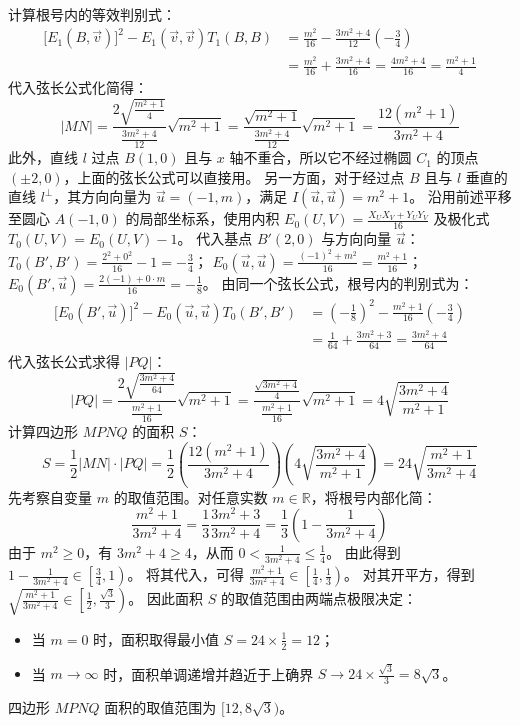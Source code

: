 \begin{solution}
计算根号内的等效判别式：
\begin{align*}
\big[E_1(B, \vec{v})\big]^2 - E_1(\vec{v}, \vec{v})T_1(B, B) &= \frac{m^2}{16} - \frac{3m^2 + 4}{12} \left(-\frac{3}{4}\right) \\
&= \frac{m^2}{16} + \frac{3m^2 + 4}{16} = \frac{4m^2 + 4}{16} = \frac{m^2 + 1}{4}
\end{align*}
代入弦长公式化简得：
$$ |MN| = \frac{2 \sqrt{\frac{m^2 + 1}{4}}}{\frac{3m^2 + 4}{12}} \sqrt{m^2 + 1} = \frac{\sqrt{m^2 + 1}}{\frac{3m^2 + 4}{12}} \sqrt{m^2 + 1} = \frac{12(m^2 + 1)}{3m^2 + 4} $$
此外，直线 $l$ 过点 $B(1,0)$ 且与 $x$ 轴不重合，所以它不经过椭圆 $C_1$ 的顶点 $(\pm 2,0)$，上面的弦长公式可以直接用。
另一方面，对于经过点 $B$ 且与 $l$ 垂直的直线 $l^\perp$，其方向向量为 $\vec{u} = (-1, m)$，满足 $I(\vec{u}, \vec{u}) = m^2 + 1$。
沿用前述平移至圆心 $A(-1,0)$ 的局部坐标系，使用内积 $E_0(U, V) = \frac{X_U X_V + Y_U Y_V}{16}$ 及极化式 $T_0(U, V) = E_0(U, V) - 1$。
代入基点 $B'(2,0)$ 与方向向量 $\vec{u}$：
$T_0(B', B') = \frac{2^2 + 0^2}{16} - 1 = -\frac{3}{4}$；
$E_0(\vec{u}, \vec{u}) = \frac{(-1)^2 + m^2}{16} = \frac{m^2 + 1}{16}$；
$E_0(B', \vec{u}) = \frac{2(-1) + 0 \cdot m}{16} = -\frac{1}{8}$。
由同一个弦长公式，根号内的判别式为：
\begin{align*}
\big[E_0(B', \vec{u})\big]^2 - E_0(\vec{u}, \vec{u})T_0(B', B') &= \left(-\frac{1}{8}\right)^2 - \frac{m^2 + 1}{16}\left(-\frac{3}{4}\right) \\
&= \frac{1}{64} + \frac{3m^2 + 3}{64} = \frac{3m^2 + 4}{64}
\end{align*}
代入弦长公式求得 $|PQ|$：
$$ |PQ| = \frac{2\sqrt{\frac{3m^2 + 4}{64}}}{\frac{m^2 + 1}{16}} \sqrt{m^2 + 1} = \frac{\frac{\sqrt{3m^2 + 4}}{4}}{\frac{m^2 + 1}{16}} \sqrt{m^2 + 1} = 4\sqrt{\frac{3m^2 + 4}{m^2 + 1}} $$
计算四边形 $MPNQ$ 的面积 $S$：
$$ S = \frac{1}{2} |MN| \cdot |PQ| = \frac{1}{2} \left( \frac{12(m^2 + 1)}{3m^2 + 4} \right) \left( 4\sqrt{\frac{3m^2 + 4}{m^2 + 1}} \right) = 24\sqrt{\frac{m^2 + 1}{3m^2 + 4}} $$
先考察自变量 $m$ 的取值范围。对任意实数 $m \in \mathbb{R}$，将根号内部化简：
$$ \frac{m^2 + 1}{3m^2 + 4} = \frac{1}{3} \frac{3m^2 + 3}{3m^2 + 4} = \frac{1}{3} \left( 1 - \frac{1}{3m^2 + 4} \right) $$
由于 $m^2 \ge 0$，有 $3m^2 + 4 \ge 4$，从而 $0 < \frac{1}{3m^2 + 4} \le \frac{1}{4}$。
由此得到 $1 - \frac{1}{3m^2 + 4} \in \left[ \frac{3}{4}, 1 \right)$。
将其代入，可得 $\frac{m^2 + 1}{3m^2 + 4} \in \left[ \frac{1}{4}, \frac{1}{3} \right)$。
对其开平方，得到 $\sqrt{\frac{m^2 + 1}{3m^2 + 4}} \in \left[ \frac{1}{2}, \frac{\sqrt{3}}{3} \right)$。
因此面积 $S$ 的取值范围由两端点极限决定：
\begin{itemize}
\item 当 $m = 0$ 时，面积取得最小值 $S = 24 \times \frac{1}{2} = 12$；
\item 当 $m \to \infty$ 时，面积单调递增并趋近于上确界 $S \to 24 \times \frac{\sqrt{3}}{3} = 8\sqrt{3}$。
\end{itemize}
四边形 $MPNQ$ 面积的取值范围为 $[12, 8\sqrt{3})$。
\end{solution}

